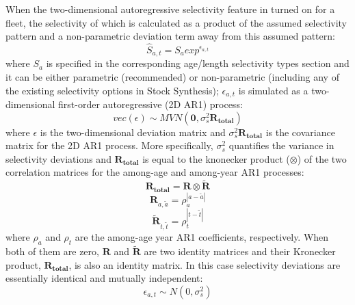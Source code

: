 When the two-dimensional autoregressive selectivity feature in turned on for a fleet, the selectivity of which is calculated as a product of the assumed selectivity pattern and a non-parametric deviation term away from this assumed pattern:
	\begin{equation}
		\hat{S}_{a,t} = S_aexp^{\epsilon_{a,t}}
	\end{equation}
where $S_a$ is specified in the corresponding age/length selectivity types section and it can be either parametric (recommended) or non-parametric (including any of the existing selectivity options in Stock Synthesis); $\epsilon_{a,t}$ is simulated as a two-dimensional first-order autoregressive (2D AR1) process:
	\begin{equation}
		vec(\epsilon) \sim MVN(\mathbf{0},\sigma_s^2\mathbf{R_{total}})
	\end{equation}
where $\epsilon$ is the two-dimensional deviation matrix and $\sigma_s^2\mathbf{R_{total}}$ is the covariance matrix for the 2D AR1 process. More specifically, $\sigma_s^2$ quantifies the variance in selectivity deviations and $\mathbf{R_{total}}$ is equal to the knonecker product ($\otimes$) of the two correlation matrices for the among-age and among-year AR1 processes:
	\begin{equation}
		\mathbf{R_{total}}=\mathbf{R}\otimes\mathbf{\tilde{R}}
	\end{equation}
	\begin{equation}
	\mathbf{R}_{a,\tilde{a}}=\rho_a^{|a-\tilde{a}|}
	\end{equation}
	\begin{equation}
	\mathbf{\tilde{R}}_{t,\tilde{t}}=\rho_t^{|t-\tilde{t}|}
	\end{equation}
	where $\rho_a$ and $\rho_t$ are the among-age year AR1 coefficients, respectively. When both of them are zero, $\mathbf{R}$ and $\mathbf{\tilde{R}}$ are two identity matrices and their Kronecker product, $\mathbf{R_{total}}$, is also an identity matrix. In this case selectivity deviations are essentially identical and mutually independent:
	\begin{equation}
		\epsilon_{a,t}\sim N(0,\sigma_s^2)
	\end{equation} 

